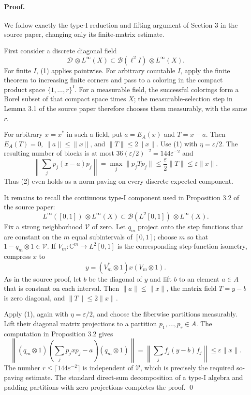 \documentclass[11pt]{article}
\newcommand{\cB}{\mathcal B}
\begin{document}
\paragraph{Proof.}
We follow exactly the type-I reduction and lifting argument of Section 3 in
the source paper, changing only its finite-matrix estimate.

First consider a discrete diagonal field
\[
  \mathcal D\,\overline\otimes L^\infty(X)
  \subset \cB(\ell^2 I)\,\overline\otimes L^\infty(X).
\]
For finite $I$, (1) applies pointwise.  For arbitrary countable $I$, apply the
finite theorem to increasing finite corners and pass to a coloring in the
compact product space $\{1,\ldots,r\}^{I}$.  For a measurable field, the
successful colorings form a Borel subset of that compact space times $X$;
the measurable-selection step in Lemma 3.1 of the source paper therefore
chooses them measurably, with the same $r$.

For arbitrary $x=x^*$ in such a field, put $a=E_A(x)$ and $T=x-a$.  Then
$E_A(T)=0$, $\|a\|\le\|x\|$, and $\|T\|\le2\|x\|$.  Use (1) with
$\eta=\varepsilon/2$.  The resulting number of blocks is at most
$36(\varepsilon/2)^{-2}=144\varepsilon^{-2}$ and
\[
  \left\|\sum_j p_j(x-a)p_j\right\|
  =\max_j\|p_jTp_j\|
  \le \frac{\varepsilon}{2}\|T\|
  \le \varepsilon\|x\|.                                       \tag{3}
\]
Thus (2) even holds as a norm paving on every discrete expected component.

It remains to recall the continuous type-I component used in Proposition 3.2
of the source paper:
\[
 L^\infty([0,1])\,\overline\otimes L^\infty(X)
 \subset
 \cB(L^2[0,1])\,\overline\otimes L^\infty(X).                   \tag{4}
\]
Fix a strong neighborhood $\mathcal V$ of zero.  Let $q_m$ project onto the
step functions that are constant on the $m$ equal subintervals of $[0,1]$;
choose $m$ so that $1-q_m\otimes1\in\mathcal V$.  If
$V_m:\mathbb C^m\to L^2[0,1]$ is the corresponding step-function isometry,
compress $x$ to
\[
 y=(V_m^*\otimes1)x(V_m\otimes1).
\]
As in the source proof, let $b$ be the diagonal of $y$ and lift $b$ to an
element $a\in A$ that is constant on each interval.  Then
$\|a\|\le\|x\|$, the matrix field $T=y-b$ is zero diagonal, and
$\|T\|\le2\|x\|$.

Apply (1), again with $\eta=\varepsilon/2$, and choose the fiberwise
partitions measurably.  Lift their diagonal matrix projections to a partition
$p_1,\ldots,p_r\in A$.  The computation in Proposition 3.2 gives
\[
 \left\|(q_m\otimes1)
   \left(\sum_jp_jxp_j-a\right)(q_m\otimes1)\right\|
 =\left\|\sum_j f_j(y-b)f_j\right\|
 \le\varepsilon\|x\|.                                         \tag{5}
\]
The number $r\le\lceil144\varepsilon^{-2}\rceil$ is independent of
$\mathcal V$, which is precisely the required so-paving estimate.  The
standard direct-sum decomposition of a type-I algebra and padding partitions
with zero projections completes the proof. \qed
\end{document}
